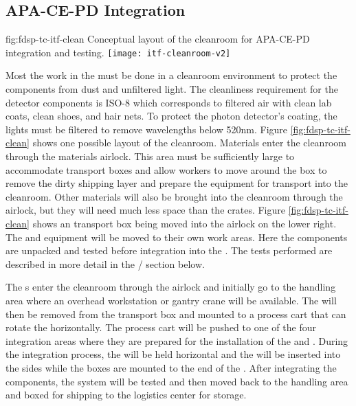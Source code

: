 \subsection{APA-CE-PD Integration}
\label{sec:fdsp-tc-itf-integ}

\begin{dunefigure}{fig:fdsp-tc-itf-clean}
{Conceptual layout of the cleanroom for APA-CE-PD integration and testing.}
\texttt{[image: itf-cleanroom-v2]}
\end{dunefigure}

Most the work in the  must be done in a cleanroom environment to protect the components from dust and unfiltered light. The cleanliness requirement for the detector components is ISO-8 which corresponds to filtered air with clean lab coats, clean shoes, and hair nets. 
To protect the photon detector's  coating, the lights must be filtered to remove wavelengths below 520nm.\cite{LBNE-docdb-8348} 
Figure \ref{fig:fdsp-tc-itf-clean} shows one possible layout of the cleanroom.
Materials enter the  cleanroom through the materials airlock. This area must be sufficiently large to accommodate  transport boxes and allow workers to move around the box to remove the dirty shipping layer and prepare the equipment for transport into the cleanroom. 
Other materials will also be brought into the cleanroom through the airlock, but they will need much less space than the  crates. Figure \ref{fig:fdsp-tc-itf-clean} shows an  transport box being moved into the airlock on the lower right.
The  and  equipment will be moved to their own work areas. 
Here the components are unpacked and tested before integration into the . 
The tests performed are described in more detail in the / section below. 

The s enter the cleanroom through the airlock and initially go to the  handling area where an overhead workstation or gantry crane will be available. 
The  will then be removed from the transport box and mounted to a process cart that can rotate the  horizontally. The process cart will be pushed to one of the four  integration areas where they are prepared for the installation of the  and . 
During the integration process, the  will be held horizontal and the  will be inserted into the sides while the  boxes are mounted to the end of the . 
After integrating the components, the system will be tested and then moved back to the handling area and boxed for shipping to the logistics center for storage.  

